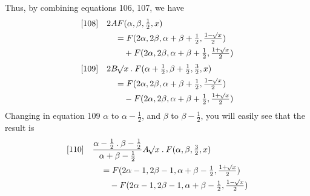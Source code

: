 Thus, by combining equations 106, 107, we have
\[
\begin{aligned}
{}[108]\quad&2AF(\alpha,\beta,\tfrac12,x)\\
&\quad=F(2\alpha,2\beta,\alpha+\beta+\tfrac12,\tfrac{1-\mathord{{}^{}\!\surd}x}2)\\&\qquad+F(2\alpha,2\beta,\alpha+\beta+\tfrac12,\tfrac{1+\mathord{{}^{}\!\surd}x}2)
\end{aligned}
\]
\[
\begin{aligned}
{}[109]\quad&2B\mathord{{}^{}\!\surd}x\mathbin{.}F(\alpha+\tfrac12,\beta+\tfrac12,\tfrac32,x)\\
&\quad=F(2\alpha,2\beta,\alpha+\beta+\tfrac12,\tfrac{1-\mathord{{}^{}\!\surd}x}2)\\&\qquad-F(2\alpha,2\beta,\alpha+\beta+\tfrac12,\tfrac{1+\mathord{{}^{}\!\surd}x}2)
\end{aligned}
\]
Changing in equation 109 $\alpha$ to $\alpha-\frac12$, and $\beta$ to $\beta-\frac12$, you will easily see that the result is
\[
\begin{aligned}
{}[110]\quad&\frac{\alpha-\tfrac12\mathbin{.}\beta-\tfrac12}{\alpha+\beta-\tfrac12}A\mathord{{}^{}\!\surd}x\mathbin{.}F(\alpha,\beta,\tfrac32,x)\\
&\quad=F(2\alpha-1,2\beta-1,\alpha+\beta-\tfrac12,\tfrac{1+\mathord{{}^{}\!\surd}x}2)\\&\qquad-F(2\alpha-1,2\beta-1,\alpha+\beta-\tfrac12,\tfrac{1-\mathord{{}^{}\!\surd}x}2)
\end{aligned}
\]
